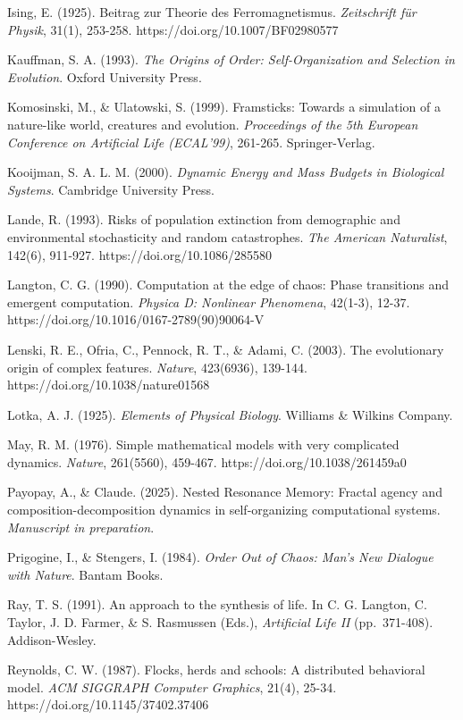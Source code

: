 \documentclass[
]{article}
\begin{document}
Ising, E. (1925). Beitrag zur Theorie des Ferromagnetismus.
\emph{Zeitschrift für Physik}, 31(1), 253-258.
https://doi.org/10.1007/BF02980577

Kauffman, S. A. (1993). \emph{The Origins of Order: Self-Organization
and Selection in Evolution}. Oxford University Press.

Komosinski, M., \& Ulatowski, S. (1999). Framsticks: Towards a
simulation of a nature-like world, creatures and evolution.
\emph{Proceedings of the 5th European Conference on Artificial Life
(ECAL'99)}, 261-265. Springer-Verlag.

Kooijman, S. A. L. M. (2000). \emph{Dynamic Energy and Mass Budgets in
Biological Systems}. Cambridge University Press.

Lande, R. (1993). Risks of population extinction from demographic and
environmental stochasticity and random catastrophes. \emph{The American
Naturalist}, 142(6), 911-927. https://doi.org/10.1086/285580

Langton, C. G. (1990). Computation at the edge of chaos: Phase
transitions and emergent computation. \emph{Physica D: Nonlinear
Phenomena}, 42(1-3), 12-37. https://doi.org/10.1016/0167-2789(90)90064-V

Lenski, R. E., Ofria, C., Pennock, R. T., \& Adami, C. (2003). The
evolutionary origin of complex features. \emph{Nature}, 423(6936),
139-144. https://doi.org/10.1038/nature01568

Lotka, A. J. (1925). \emph{Elements of Physical Biology}. Williams \&
Wilkins Company.

May, R. M. (1976). Simple mathematical models with very complicated
dynamics. \emph{Nature}, 261(5560), 459-467.
https://doi.org/10.1038/261459a0

Payopay, A., \& Claude. (2025). Nested Resonance Memory: Fractal agency
and composition-decomposition dynamics in self-organizing computational
systems. \emph{Manuscript in preparation}.

Prigogine, I., \& Stengers, I. (1984). \emph{Order Out of Chaos: Man's
New Dialogue with Nature}. Bantam Books.

Ray, T. S. (1991). An approach to the synthesis of life. In C. G.
Langton, C. Taylor, J. D. Farmer, \& S. Rasmussen (Eds.),
\emph{Artificial Life II} (pp.~371-408). Addison-Wesley.

Reynolds, C. W. (1987). Flocks, herds and schools: A distributed
behavioral model. \emph{ACM SIGGRAPH Computer Graphics}, 21(4), 25-34.
https://doi.org/10.1145/37402.37406
\end{document}
